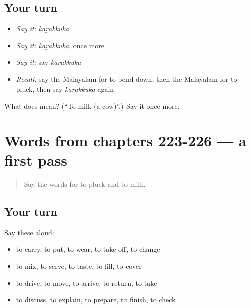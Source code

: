 \subsection*{Your turn}
\begin{itemize}
\raggedright
  \item \emph{Say it:} \emph{kaṟakkuka}
  \item \emph{Say it:} \emph{kaṟakkuka}, once more
  \item \emph{Say it:} say \emph{kaṟakkuka}
  \item \emph{Recall:} say the Malayalam for to bend down, then the Malayalam for to pluck, then say \emph{kaṟakkuka} again
\end{itemize}

\begin{tcolorbox}[breakable,colback=teal!4,colframe=teal!35!black,title={Before you move on}]
What does  mean? (\textquotedblleft{}To milk (a cow)\textquotedblright{}.) Say it once more.
\end{tcolorbox}
\section[(dialogue)]{Words from chapters 223-226 — a first pass}

\label{lesson:ML-R231-first-pass-words-from-chapters-223-226}



\begin{quote}
Say the words for to pluck and to milk.
\end{quote}

\subsection*{Your turn}
Say these aloud:

\begin{itemize}
\raggedright
  \item to carry, to put, to wear, to take off, to change
  \item to mix, to serve, to taste, to fill, to cover
  \item to drive, to move, to arrive, to return, to take
  \item to discuss, to explain, to prepare, to finish, to check
\end{itemize}

